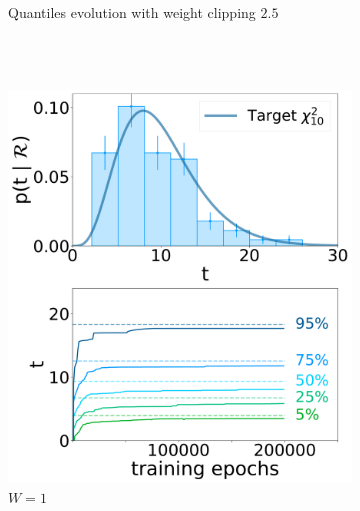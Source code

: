 \begin{figure}[h]
\begin{subfigure}[b]{0.5\textwidth}
        \caption{Quantiles evolution with weight clipping $2.5$}
        \label{fig:dt_ref:d}
    \end{subfigure}%
    \\
    \\
    \begin{subfigure}[b]{0.25\textwidth}
        \centering 
        \includegraphics[width=1.0\textwidth]{../PLOTS/DRIFT_TIME/thesis/both_1_0.pdf}
        \caption{$W=1$}
        \label{fig:dt_ref:e}
    \end{subfigure}%
    \begin{subfigure}[b]{0.25\textwidth}
        \centering 

\end{subfigure}
\end{figure}
